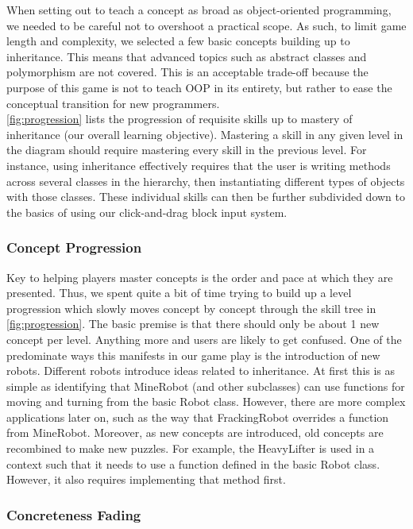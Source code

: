 \documentclass[12pt,notitlepage]{article}
\begin{document}
When setting out to teach a concept as broad as object-oriented
programming, we needed to be careful not to overshoot a practical
scope. As such, to limit game length and complexity, we selected a few
basic concepts building up to inheritance. This means that advanced topics
such as abstract classes and polymorphism are not covered. This is an
acceptable trade-off because the purpose of this game is not to teach
OOP in its entirety, but rather to ease the conceptual transition for
new programmers.\\

\autoref{fig:progression} lists the progression of requisite skills up 
to mastery of inheritance (our overall learning objective). Mastering 
a skill in any given level in the diagram should require mastering 
every skill in the previous level. For instance, using inheritance 
effectively requires that the user is writing methods across several 
classes in the hierarchy, then instantiating different types of objects 
with those classes. These individual skills can then be further subdivided
down to the basics of using our click-and-drag block input system.


\subsubsection{Concept Progression}

Key to helping players master concepts is the order and pace at which
they are presented. Thus, we spent quite a bit of time trying to build
up a level progression which slowly moves concept by concept through the
skill tree in \autoref{fig:progression}. The basic premise is that there
should only be about 1 new concept per level. Anything more and users are
likely to get confused. One of the predominate ways this manifests in our
game play is the introduction of new robots. Different robots introduce
ideas related to inheritance. At first this is as simple as identifying
that MineRobot (and other subclasses) can use functions for moving and
turning from the basic Robot class. However, there are more complex
applications later on, such as the way that FrackingRobot overrides a
function from MineRobot. Moreover, as new concepts are introduced, old
concepts are recombined to make new puzzles. For example, the HeavyLifter
is used in a context such that it needs to use a function defined in the 
basic Robot class. However, it also requires implementing that method first.

\subsubsection{Concreteness Fading}
\end{document}

